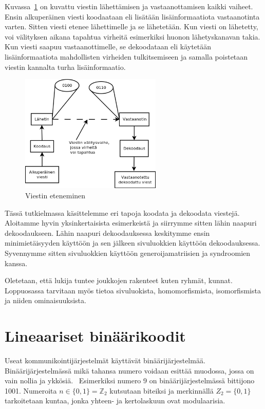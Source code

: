 \documentclass[a4paper,12pt,leqno,oneside]{report} %
\theoremstyle{plain}
\theoremstyle{plain}
\theoremstyle{definition}
\theoremstyle{remark}
\numberwithin{equation}{chapter}
\newcommand*{\Zset}{\mathbb{Z}}  %
\begin{document}
    Kuvassa~\ref{kuva:lahetys} on kuvattu viestin lähettämisen ja vastaanottamisen kaikki vaiheet. Ensin alkuperäinen viesti koodaataan eli lisätään lisäinformaatiota vastaanotinta varten. Sitten viesti etenee lähettimelle ja se lähetetään. Kun viesti on lähetetty, voi välityksen aikana tapahtua virheitä esimerkiksi huonon lähetyskanavan takia. Kun viesti saapuu vastaanottimelle, se dekoodataan eli käytetään lisäinformaatiota mahdollisten virheiden tulkitsemiseen ja samalla poistetaan viestin kannalta turha lisäinformaatio. 
    \begin{figure}
        \centering
        \includegraphics[width=0.6\textwidth]{lahetys}
        \caption{Viestin eteneminen}\label{kuva:lahetys}
    \end{figure}

    Tässä tutkielmassa käsittelemme eri tapoja koodata ja dekoodata viestejä.  Aloitamme hyvin yksinkertaisista esimerkeistä ja siirrymme sitten lähin naapuri dekoodaukseen. Lähin naapuri dekoodauksessa keskitymme ensin minimietäisyyden käyttöön ja sen jälkeen sivuluokkien käyttöön dekoodauksessa. Syvennymme sitten sivuluokkien käyttöön generoijamatriisien ja syndroomien kanssa. 

    Oletetaan, että lukija tuntee joukkojen rakenteet kuten ryhmät, kunnat. Loppu\-osassa tarvitaan myös tietoa sivuluokista, homomorfismista, isomorfismista ja niiden ominaisuuksista.

    \chapter{Lineaariset binäärikoodit}\label{ch: Lineaariset binäärikoodit}

    Useat kommunikointijärjestelmät käyttävät binäärijärjestelmää. Binäärijärjestelmässä mikä tahansa numero voidaan esittää muodossa, jossa on vain nollia ja ykkösiä.~\cite[s.~266]{GW} Esimerkiksi numero 9 on binäärijärjestelmässä bittijono 1001. Numeroita $n \in \{ 0, 1 \} = \Zset_2$ kutsutaan biteiksi ja merkinnällä $Z_2 = \{ 0, 1 \}$ tarkoitetaan kuntaa, jonka yhteen- ja kertolaskuun ovat modulaarisia.
\end{document}
